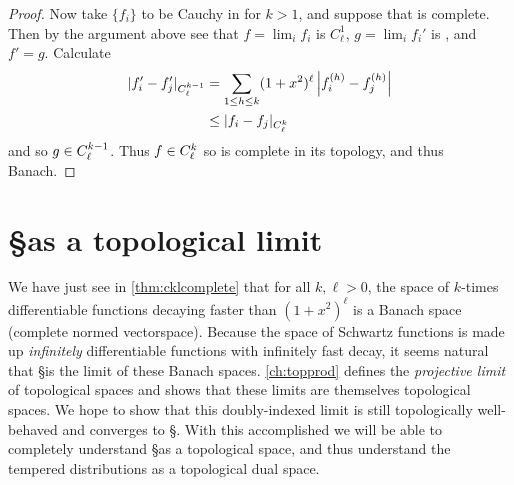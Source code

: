 \begin{proof}
        Now take $\{f_i\}$ to be Cauchy in \Ckl for $k>1$, and suppose that \Ckml is complete.
        Then by the argument above see that $f=\lim_i f_i$ is $C^1_\ell$, $g=\lim_i f_i'$ is \Cl, and $f'=g$.
        Calculate
        \begin{align*}
          |f_i'-f_j'|_{C^{k-1}_\ell}
          &= \sum_{1\le h\le k} (1+x^2)^\ell\left|f_i^{(h)}-f_j^{(h)}\right|
          \\&\le |f_i-f_j|_{C^k_\ell}
        \end{align*}
        and so $g\in{C^{k-1}_\ell}$.
        Thus $f\in{C^k_\ell}$ so \Ckl is complete in its topology, and thus Banach.
      \end{proof}

    \section{\S as a topological limit}
      
      We have just see in \cref{thm:cklcomplete} that for all $k,\ell>0$, the space \Ckl of $k$-times differentiable functions decaying faster than $(1+x^2)^\ell$ is a Banach space (complete normed vectorspace).
      Because the space of Schwartz functions is made up \emph{infinitely} differentiable functions with infinitely fast decay, it seems natural that \S is the limit of these Banach spaces.
      \cref{ch:topprod} defines the \emph{projective limit} of topological spaces and shows that these limits are themselves topological spaces.
      We hope to show that this doubly-indexed limit is still topologically well-behaved and converges to \S.
      With this accomplished we will be able to completely understand \S as a topological space, and thus understand the tempered distributions \SS as a topological dual space.

